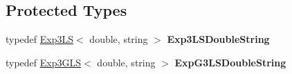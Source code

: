 \subsection*{Protected Types}
\begin{DoxyCompactItemize}
\item 
\hypertarget{classMultiBoost_1_1BanditLearner_a70ecc0e4e4b00be22da0d33f65de0eff}{
typedef \hyperlink{classMultiBoost_1_1Exp3LS}{Exp3LS}$<$ double, string $>$ {\bfseries Exp3LSDoubleString}}
\label{classMultiBoost_1_1BanditLearner_a70ecc0e4e4b00be22da0d33f65de0eff}

\item 
\hypertarget{classMultiBoost_1_1BanditLearner_a12dc78e7d9f98c6750ccdf8d852068db}{
typedef \hyperlink{classMultiBoost_1_1Exp3GLS}{Exp3GLS}$<$ double, string $>$ {\bfseries ExpG3LSDoubleString}}
\label{classMultiBoost_1_1BanditLearner_a12dc78e7d9f98c6750ccdf8d852068db}

\end{DoxyCompactItemize}
